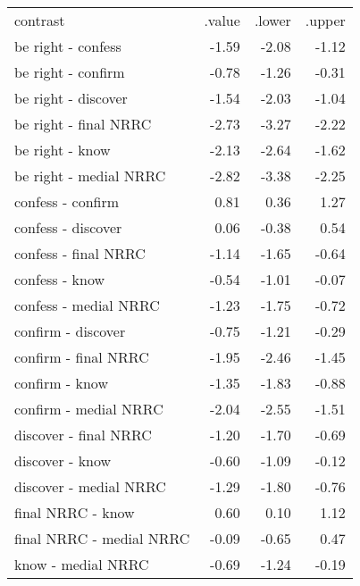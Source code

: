 \begin{longtable}{lrrr}
 contrast & .value & .lower & .upper \\ 
 be right - confess & -1.59 & -2.08 & -1.12 \\ 
  be right - confirm & -0.78 & -1.26 & -0.31 \\ 
  be right - discover & -1.54 & -2.03 & -1.04 \\ 
  be right - final NRRC & -2.73 & -3.27 & -2.22 \\ 
  be right - know & -2.13 & -2.64 & -1.62 \\ 
  be right - medial NRRC & -2.82 & -3.38 & -2.25 \\ 
  confess - confirm & 0.81 & 0.36 & 1.27 \\ 
  confess - discover & 0.06 & -0.38 & 0.54 \\ 
  confess - final NRRC & -1.14 & -1.65 & -0.64 \\ 
  confess - know & -0.54 & -1.01 & -0.07 \\ 
  confess - medial NRRC & -1.23 & -1.75 & -0.72 \\ 
  confirm - discover & -0.75 & -1.21 & -0.29 \\ 
  confirm - final NRRC & -1.95 & -2.46 & -1.45 \\ 
  confirm - know & -1.35 & -1.83 & -0.88 \\ 
  confirm - medial NRRC & -2.04 & -2.55 & -1.51 \\ 
  discover - final NRRC & -1.20 & -1.70 & -0.69 \\ 
  discover - know & -0.60 & -1.09 & -0.12 \\ 
  discover - medial NRRC & -1.29 & -1.80 & -0.76 \\ 
  final NRRC - know & 0.60 & 0.10 & 1.12 \\ 
  final NRRC - medial NRRC & -0.09 & -0.65 & 0.47 \\ 
  know - medial NRRC & -0.69 & -1.24 & -0.19 \\ 
  \end{longtable}

